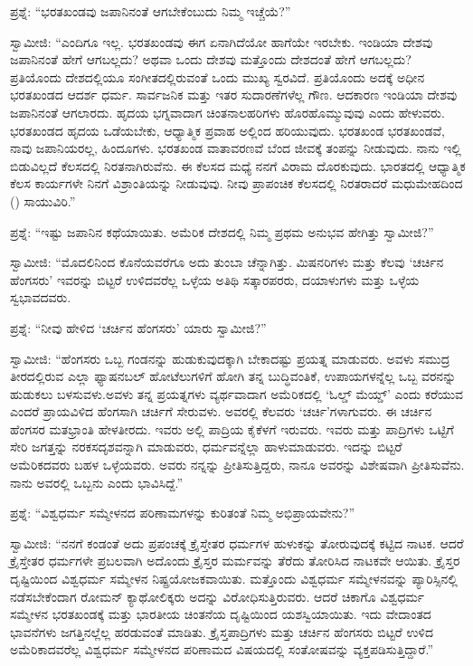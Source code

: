 \vskip 2pt

ಪ್ರಶ್ನೆ: “ಭರತಖಂಡವು ಜಪಾನಿನಂತೆ ಆಗಬೇಕೆಂಬುದು ನಿಮ್ಮ ಇಚ್ಚೆಯೆ?”

ಸ್ವಾಮೀಜಿ: “ಎಂದಿಗೂ ಇಲ್ಲ. ಭರತಖಂಡವು ಈಗ ಏನಾಗಿದೆಯೋ ಹಾಗೆಯೇ ಇರಬೇಕು. ಇಂಡಿಯಾ ದೇಶವು ಜಪಾನಿನಂತೆ ಹೇಗೆ ಆಗಬಲ್ಲದು? ಅಥವಾ ಒಂದು ದೇಶವು ಮತ್ತೊಂದು ದೇಶದಂತೆ ಹೇಗೆ ಆಗಬಲ್ಲದು? ಪ್ರತಿಯೊಂದು ದೇಶದಲ್ಲಿಯೂ ಸಂಗೀತದಲ್ಲಿರುವಂತೆ ಒಂದು ಮುಖ್ಯ ಸ್ವರವಿದೆ. ಪ್ರತಿಯೊಂದು ಅದಕ್ಕೆ ಅಧೀನ ಭರತಖಂಡದ ಆದರ್ಶ ಧರ್ಮ. ಸಾರ್ವಜನಿಕ ಮತ್ತು ಇತರ ಸುದಾರಣೆಗಳೆಲ್ಲ ಗೌಣ. ಆದಕಾರಣ ಇಂಡಿಯಾ ದೇಶವು ಜಪಾನಿನಂತೆ ಆಗಲಾರದು. ಹೃದಯ ಭಗ್ನವಾದಾಗ ಚಿಂತನಾಲಹರಿಗಳು ಹೊರಹೊಮ್ಮುವುವು ಎಂದು ಹೇಳುವರು. ಭರತಖಂಡದ ಹೃದಯ ಒಡೆಯಬೇಕು, ಆಧ್ಯಾತ್ಮಿಕ ಪ್ರವಾಹ ಅಲ್ಲಿಂದ ಹರಿಯುವುದು. ಭರತಖಂಡ ಭರತಖಂಡವೆ, ನಾವು ಜಪಾನಿಯರಲ್ಲ, ಹಿಂದೂಗಳು. ಭರತಖಂಡ ವಾತಾವರಣವೆ ಬೆಂದ ಜೀವಕ್ಕೆ ತಂಪನ್ನು ನೀಡುವುದು. ನಾನು ಇಲ್ಲಿ ಬಿಡುವಿಲ್ಲದೆ ಕೆಲಸದಲ್ಲಿ ನಿರತನಾಗಿರುವೆನು. ಈ ಕೆಲಸದ ಮಧ್ಯೆ ನನಗೆ ವಿರಾಮ ದೊರಕುವುದು. ಭಾರತದಲ್ಲಿ ಆಧ್ಯಾತ್ಮಿಕ ಕೆಲಸ ಕಾರ್ಯಗಳೇ ನಿನಗೆ ವಿಶ್ರಾಂತಿಯನ್ನು ನೀಡುವುವು. ನೀವು ಪ್ರಾಪಂಚಿಕ ಕೆಲಸದಲ್ಲಿ ನಿರತರಾದರೆ ಮಧುಮೇಹದಿಂದ () ಸಾಯುವಿರಿ.”

\vskip 3pt

ಪ್ರಶ್ನೆ: “ಇಷ್ಟು ಜಪಾನಿನ ಕಥೆಯಾಯಿತು. ಅಮೆರಿಕ ದೇಶದಲ್ಲಿ ನಿಮ್ಮ ಪ್ರಥಮ ಅನುಭವ ಹೇಗಿತ್ತು ಸ್ವಾಮೀಜಿ?”

\vskip 4pt

ಸ್ವಾಮೀಜಿ: “ಮೊದಲಿನಿಂದ ಕೊನೆಯವರೆಗೂ ಅದು ತುಂಬಾ ಚೆನ್ನಾಗಿತ್ತು. ಮಿಷನರಿಗಳು ಮತ್ತು ಕೆಲವು ‘ಚರ್ಚಿನ ಹೆಂಗಸರು’ ಇವರನ್ನು ಬಿಟ್ಟರೆ ಉಳಿದವರೆಲ್ಲ ಒಳ್ಳೆಯ ಅತಿಥಿ ಸತ್ಕಾರಪರರು, ದಯಾಳುಗಳು ಮತ್ತು ಒಳ್ಳೆಯ ಸ್ವಭಾವದವರು.

\vskip 4pt

ಪ್ರಶ್ನೆ: “ನೀವು ಹೇಳಿದ ‘ಚರ್ಚಿನ ಹೆಂಗಸರು’ ಯಾರು ಸ್ವಾಮೀಜಿ?”

\vskip 4pt

ಸ್ವಾಮೀಜಿ: “ಹೆಂಗಸರು ಒಬ್ಬ ಗಂಡನನ್ನು ಹುಡುಕುವುದಕ್ಕಾಗಿ ಬೇಕಾದಷ್ಟು ಪ್ರಯತ್ನ ಮಾಡುವರು. ಅವಳು ಸಮುದ್ರ ತೀರದಲ್ಲಿರುವ ಎಲ್ಲಾ ಫ್ಯಾಷನಬಲ್​ ಹೋಟೆಲುಗಳಿಗೆ ಹೋಗಿ ತನ್ನ ಬುದ್ಧಿವಂತಿಕೆ, ಉಪಾಯಗಳನ್ನೆಲ್ಲ ಒಬ್ಬ ವರನನ್ನು ಹುಡುಕಲು ಬಳಸುವಳು.\break ಅವಳು ತನ್ನ ಪ್ರಯತ್ನಗಳು ವ್ಯರ್ಥವಾದಾಗ ಅಮೆರಿಕದಲ್ಲಿ ‘ಓಲ್ಡ್​ ಮೆಯ್ಡ್​’ ಎಂದು ಕರೆಯುವ ಎಂದರೆ ಪ್ರಾಯವಿಳಿದ ಹೆಂಗಸಾಗಿ ಚರ್ಚಿಗೆ ಸೇರುವಳು. ಅವರಲ್ಲಿ ಕೆಲವರು ‘ಚರ್ಚಿ’ಗಳಾಗುವರು. ಈ ಚರ್ಚಿನ ಹೆಂಗಸರ ಮತಭ್ರಾಂತಿ ಹೇಳತೀರದು. ಇವರು ಅಲ್ಲಿ ಪಾದ್ರಿಯ ಕೈಕೆಳಗೆ ಇರುವರು. ಇವರು ಮತ್ತು ಪಾದ್ರಿಗಳು ಒಟ್ಟಿಗೆ ಸೇರಿ ಜಗತ್ತನ್ನು ನರಕಸದೃಶವನ್ನಾಗಿ ಮಾಡುವರು, ಧರ್ಮವನ್ನೆಲ್ಲಾ ಹಾಳುಮಾಡುವರು. ಇದನ್ನು ಬಿಟ್ಟರೆ ಅಮೆರಿಕದವರು ಬಹಳ ಒಳ್ಳೆಯವರು. ಅವರು ನನ್ನನ್ನು ಪ್ರೀತಿಸುತ್ತಿದ್ದರು, ನಾನೂ ಅವರನ್ನು ವಿಶೇಷವಾಗಿ ಪ್ರೀತಿಸುವೆನು. ನಾನು ಅವರಲ್ಲಿ ಒಬ್ಬನು ಎಂದು ಭಾವಿಸಿದ್ದೆ.”

\vskip 4pt

ಪ್ರಶ್ನೆ: “ವಿಶ್ವಧರ್ಮ ಸಮ್ಮೇಳನದ ಪರಿಣಾಮಗಳನ್ನು ಕುರಿತಂತೆ ನಿಮ್ಮ ಅಭಿಪ್ರಾಯವೇನು?”

\vskip 3pt

ಸ್ವಾಮೀಜಿ: “ನನಗೆ ಕಂಡಂತೆ ಅದು ಪ್ರಪಂಚಕ್ಕೆ ಕ್ರೈಸ್ತೇತರ ಧರ್ಮಗಳ ಹುಳುಕನ್ನು ತೋರುವುದಕ್ಕೆ ಕಟ್ಟಿದ ನಾಟಕ. ಆದರೆ ಕ್ರೈಸ್ತೇತರ ಧರ್ಮಗಳೇ ಪ್ರಬಲವಾಗಿ ಅದೊಂದು ಕ್ರೈಸ್ತರ ಮರ್ಮವನ್ನು ತೆರೆದು ತೋರಿಸಿದ ನಾಟಕವೇ ಆಯಿತು. ಕ್ರೈಸ್ತರ ದೃಷ್ಟಿಯಿಂದ ವಿಶ್ವಧರ್ಮ ಸಮ್ಮೇಳನ ನಿಷ್ಪ್ರಯೋಜಕವಾಯಿತು. ಮತ್ತೊಂದು ವಿಶ್ವಧರ್ಮ ಸಮ್ಮೇಳನವನ್ನು ಪ್ಯಾರಿಸ್ಸಿನಲ್ಲಿ ನಡೆಸಬೇಕೆಂದಾಗ ರೋಮನ್​ ಕ್ಯಾಥೋಲಿಕ್ಕರು ಅದನ್ನು ವಿರೋಧಿಸುತ್ತಿರುವರು. ಆದರೆ ಚಿಕಾಗೊ ವಿಶ್ವಧರ್ಮ ಸಮ್ಮೇಳನ ಭರತಖಂಡಕ್ಕೆ ಮತ್ತು ಭಾರತೀಯ ಚಿಂತನೆಯ ದೃಷ್ಟಿಯಿಂದ ಯಶಸ್ವಿಯಾಯಿತು. ಇದು ವೇದಾಂತದ ಭಾವನೆಗಳು ಜಗತ್ತಿನಲ್ಲೆಲ್ಲ ಹರಡುವಂತೆ ಮಾಡಿತು. ಕ್ರೈಸ್ತಪಾದ್ರಿಗಳು ಮತ್ತು ಚರ್ಚಿನ ಹೆಂಗಸರು ಬಿಟ್ಟರೆ ಉಳಿದ ಅಮೆರಿಕಾದವರೆಲ್ಲ ವಿಶ್ವಧರ್ಮ ಸಮ್ಮೇಳನದ ಪರಿಣಾಮದ ವಿಷಯದಲ್ಲಿ ಸಂತೋಷವನ್ನು ವ್ಯಕ್ತಪಡಿಸುತ್ತಿದ್ದಾರೆ.”


